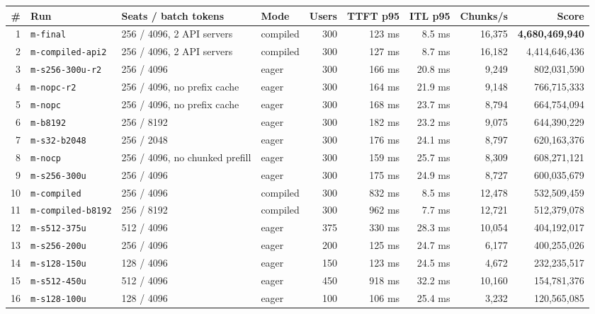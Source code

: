 \documentclass[10pt,a4paper]{article}
\begin{document}
\begin{center}\scriptsize
\setlength{\tabcolsep}{3.6pt}
\begin{tabular}{@{}rlllrrrrr@{}}
\toprule
\# & \textbf{Run} & \textbf{Seats / batch tokens} & \textbf{Mode} & \textbf{Users} & \textbf{TTFT p95} & \textbf{ITL p95} & \textbf{Chunks/s} & \textbf{Score} \\
\midrule
1 & \texttt{m-final} & 256 / 4096, 2 API servers & compiled & 300 & 123 ms & 8.5 ms & 16,375 & \textbf{4,680,469,940} \\
2 & \texttt{m-compiled-api2} & 256 / 4096, 2 API servers & compiled & 300 & 127 ms & 8.7 ms & 16,182 & 4,414,646,436 \\
3 & \texttt{m-s256-300u-r2} & 256 / 4096 & eager & 300 & 166 ms & 20.8 ms & 9,249 & 802,031,590 \\
4 & \texttt{m-nopc-r2} & 256 / 4096, no prefix cache & eager & 300 & 164 ms & 21.9 ms & 9,148 & 766,715,333 \\
5 & \texttt{m-nopc} & 256 / 4096, no prefix cache & eager & 300 & 168 ms & 23.7 ms & 8,794 & 664,754,094 \\
6 & \texttt{m-b8192} & 256 / 8192 & eager & 300 & 182 ms & 23.2 ms & 9,075 & 644,390,229 \\
7 & \texttt{m-s32-b2048} & 256 / 2048 & eager & 300 & 176 ms & 24.1 ms & 8,797 & 620,163,376 \\
8 & \texttt{m-nocp} & 256 / 4096, no chunked prefill & eager & 300 & 159 ms & 25.7 ms & 8,309 & 608,271,121 \\
9 & \texttt{m-s256-300u} & 256 / 4096 & eager & 300 & 175 ms & 24.9 ms & 8,727 & 600,035,679 \\
10 & \texttt{m-compiled} & 256 / 4096 & compiled & 300 & 832 ms & 8.5 ms & 12,478 & 532,509,459 \\
11 & \texttt{m-compiled-b8192} & 256 / 8192 & compiled & 300 & 962 ms & 7.7 ms & 12,721 & 512,379,078 \\
12 & \texttt{m-s512-375u} & 512 / 4096 & eager & 375 & 330 ms & 28.3 ms & 10,054 & 404,192,017 \\
13 & \texttt{m-s256-200u} & 256 / 4096 & eager & 200 & 125 ms & 24.7 ms & 6,177 & 400,255,026 \\
14 & \texttt{m-s128-150u} & 128 / 4096 & eager & 150 & 123 ms & 24.5 ms & 4,672 & 232,235,517 \\
15 & \texttt{m-s512-450u} & 512 / 4096 & eager & 450 & 918 ms & 32.2 ms & 10,160 & 154,781,376 \\
16 & \texttt{m-s128-100u} & 128 / 4096 & eager & 100 & 106 ms & 25.4 ms & 3,232 & 120,565,085 \\

\end{tabular}
\end{center}
\end{document}
